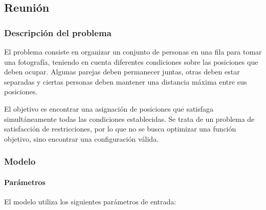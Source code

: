 \subsection{Reunión}

\subsubsection{Descripción del problema}

El problema consiste en organizar un conjunto de personas en una fila para tomar una fotografía, teniendo en cuenta diferentes condiciones sobre las posiciones que deben ocupar. Algunas parejas deben permanecer juntas, otras deben estar separadas y ciertas personas deben mantener una distancia máxima entre sus posiciones.

El objetivo es encontrar una asignación de posiciones que satisfaga simultáneamente todas las condiciones establecidas. Se trata de un problema de satisfacción de restricciones, por lo que no se busca optimizar una función objetivo, sino encontrar una configuración válida.

\subsubsection{Modelo}

\paragraph{Parámetros}

El modelo utiliza los siguientes parámetros de entrada:

